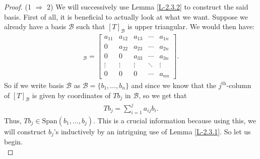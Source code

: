 \documentclass[letterpaper,11pt,twoside]{article}
\theoremstyle{definition}
\theoremstyle{definition}
\theoremstyle{definition}
\theoremstyle{definition}
\theoremstyle{definition}
\theoremstyle{definition}
\theoremstyle{remark}
\theoremstyle{definition}
\newcommand{\Span}[1]{\text{Span}\left(#1\right)}
\begin{document}
    \begin{proof}
        (1 $\Rightarrow$ 2) We will successively use Lemma \ref{L-2.3.2} to construct the said basis. First of all, it is beneficial to actually look at what we want. Suppose we already have a basis $\mathcal{B}$ such that $[T]_\mathcal{B}$ is upper triangular. We would then have:
        \begin{align*}
            [T]_\mathcal{B} = \begin{bmatrix}
            a_{11} &a_{12} & a_{13} &\cdots &a_{1n}\\
            0&a_{22} &a_{23} &\cdots &a_{2n}\\
            0&0&a_{33}&\cdots &a_{3n}\\
            \vdots &\vdots &\vdots &\ddots &\vdots\\
            0 &0 &0 &\cdots &a_{nn}
            \end{bmatrix}.
        \end{align*}
        So if we write basis $\mathcal{B}$ as $\mathcal{B} = \{b_1,\dots,b_n\}$ and since we know that the $j^{\text{th}}$-column of $[T]_\mathcal{B}$ is given by coordinates of $Tb_j$ in $\mathcal{B}$, so we get that
        \begin{align*}
            Tb_j = \sum_{i=1}^j a_{ij}b_i.
        \end{align*}
        Thus, $Tb_j \in \Span{b_1,\dots,b_j}$. This is a crucial information because using this, we will construct $b_j$'s inductively by an intriguing use of Lemma \ref{L-2.3.1}. So let us begin.\\
        

\end{proof}
\end{document}
